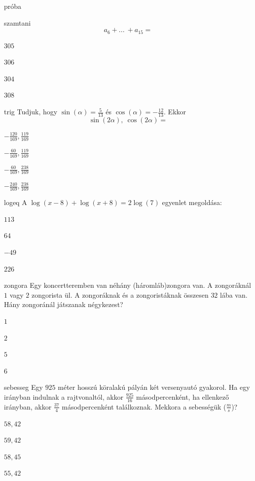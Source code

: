 \documentclass[12pt]{article}
\begin{document}
\begin{quiz}{próba}
\begin{multi}{szamtani}
$$
a_{6}+{...\:} +a_{15}=
$$
\item* $305$
\item  $306$
\item  $304$
\item  $308$
\end{multi}
\begin{multi}{trig}
Tudjuk, hogy $ \sin(\alpha) =\frac{5}{13}$ és $ \cos(\alpha) = -\frac{12}{13} $. 
Ekkor $$ \sin(2\alpha),\ \cos(2\alpha)=$$
\item* $ -\frac{120}{169}, \frac{119}{169} $
\item  $ -\frac{60}{169}, \frac{119}{169} $
\item  $ -\frac{60}{169}, \frac{238}{169} $
\item  $ -\frac{240}{169}, \frac{238}{169} $
\end{multi}
\begin{multi}{logeq}
A $ \log(x-8)+\log(x+8)=2\log(7) $ egyenlet megoldása:
\item* $ 113  $
\item  $ 64 $
\item  $ -49 $
\item  $ 226 $
\end{multi}
\begin{multi}{zongora}
Egy koncertteremben van néhány (háromláb)zongora van. A zongoráknál 
$1$ vagy $2$ zongorista ül. A zongoráknak és a zongoristáknak összesen $32$ 
lába van. Hány zongoránál játszanak négykezest?
\item* $ 1  $
\item  $ 2 $
\item  $ 5 $
\item  $ 6 $
\end{multi}
\begin{multi}{sebesseg}
Egy $925$ méter hosszú köralakú pályán két versenyautó gyakorol. Ha egy irányban 
indulnak a rajtvonaltól, akkor $\frac{925}{16}$ másodpercenként, ha ellenkező irányban, akkor 
$\frac{37}{4}$ másodpercenként találkoznak. Mekkora a sebességük ($\frac{m}{s}$)?
\item* $ 58, 42  $
\item  $ 59, 42 $
\item  $ 58, 45 $
\item  $ 55, 42 $
\end{multi}
\end{quiz}
\end{document}
